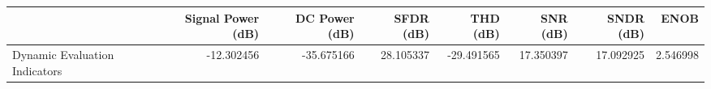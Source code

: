 \begin{tabular}{lrrrrrrr}
\toprule
{} &  Signal Power (dB) &  DC Power (dB) &  SFDR (dB) &   THD (dB) &   SNR (dB) &  SNDR (dB) &      ENOB \\
\midrule
Dynamic Evaluation Indicators &         -12.302456 &     -35.675166 &  28.105337 & -29.491565 &  17.350397 &  17.092925 &  2.546998 \\
\bottomrule
\end{tabular}
